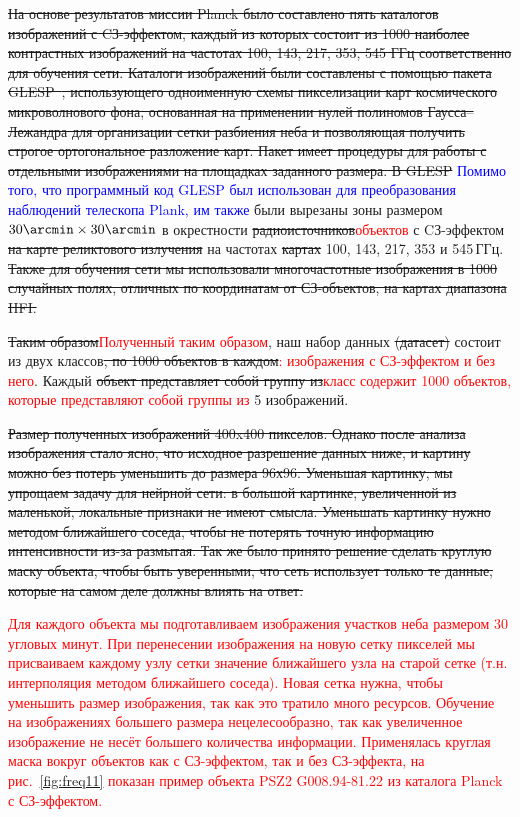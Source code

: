 \documentclass[
aps,%
12pt,%
final,%
notitlepage,%
oneside,%
onecolumn,%
nobibnotes,%
nofootinbib,%
superscriptaddress,%
noshowpacs,%
centertags]%
{revtex4}
\begin{document}
\sout{На основе результатов миссии Planck было составлено пять каталогов изображений с CЗ-эффектом, каждый из которых состоит из 1000 наиболее контрастных изображений на частотах 100, 143, 217, 353, 545 ГГц соответственно \cite{planck_zs} для обучения сети.
Каталоги изображений были составлены с помощью пакета GLESP~\cite{glesp1}, использующего одноименную схемы пикселизации карт космического микроволнового фона, основанная на применении нулей полиномов Гаусса--Лежандра для организации сетки разбиения неба и позволяющая получить строгое ортогональное разложение карт. Пакет имеет процедуры для работы с отдельными изображениями на площадках заданного размера.
В GLESP} \textcolor{blue}{Помимо того, что программный код GLESP был использован для преобразования наблюдений телескопа Plank, им также} были вырезаны зоны размером $30\arcmin\times30\arcmin$ в окрестности \sout{радиоисточников}\textcolor{red}{объектов} с CЗ-эффектом \sout{на карте реликтового излучения} на частотах \sout{картах} 100, 143, 217, 353 и 545\,ГГц. \sout{Также для обучения сети мы использовали многочастотные изображения в 1000 случайных полях, отличных по координатам от СЗ-объектов, на картах диапазона HFI.}

\sout{Таким образом}\textcolor{red}{Полученный таким образом}, наш набор данных\sout{ (датасет)} состоит из двух классов\sout{, по 1000 объектов в каждом}\textcolor{red}{: изображения с СЗ-эффектом и без него}. Каждый \sout{объект представляет собой группу из}\textcolor{red}{класс содержит 1000 объектов, которые представляют собой группы из} 5 изображений. 

\sout{Размер полученных изображений 400x400 пикселов. Однако после анализа изображения стало ясно, что исходное разрешение данных ниже, и картину можно без потерь уменьшить до размера 96х96. Уменьшая картинку, мы упрощаем задачу для нейрной сети: в большой картинке, увеличенной из маленькой, локальные признаки не имеют смысла. Уменьшать картинку нужно методом ближайшего соседа, чтобы не потерять  точную информацию интенсивности из-за размытая. Так же было принято решение сделать круглую маску объекта, чтобы быть уверенными, что сеть использует только те данные, которые на самом деле должны влиять на ответ.}

\textcolor{red} {Для каждого объекта мы подготавливаем изображения участков неба размером 30 угловых минут. При перенесении изображения на новую сетку пикселей мы присваиваем каждому узлу сетки значение ближайшего узла на старой сетке (т.н. интерполяция методом ближайшего соседа). Новая сетка нужна, чтобы уменьшить размер изображения, так как это тратило много ресурсов. Обучение на изображениях большего размера нецелесообразно, так как увеличенное изображение не несёт большего количества информации. Применялась круглая маска вокруг объектов как с СЗ-эффектом, так и без СЗ-эффекта, на рис.~\ref{fig:freq11} показан пример объекта PSZ2 G008.94-81.22  из каталога Planck \cite{Planck1} с СЗ-эффектом.} 
\end{document}
